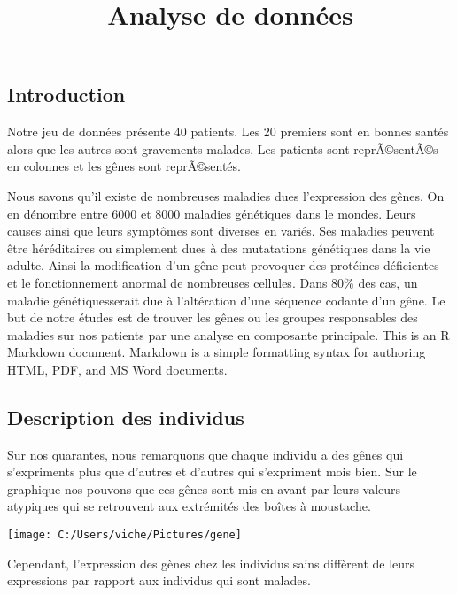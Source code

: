 \documentclass[]{article}
\title{Analyse de données}
\author{}
\date{}
\begin{document}
\maketitle

\hypertarget{introduction}{%
\subsection{Introduction}\label{introduction}}

Notre jeu de données présente 40 patients. Les 20 premiers sont en
bonnes santés alors que les autres sont gravements malades. Les patients
sont reprÃ©sentÃ©s en colonnes et les gênes sont reprÃ©sentés.

Nous savons qu'il existe de nombreuses maladies dues l'expression des
gênes. On en dénombre entre 6000 et 8000 maladies génétiques dans le
mondes. Leurs causes ainsi que leurs symptômes sont diverses en variés.
Ses maladies peuvent être héréditaires ou simplement dues à des
mutatations génétiques dans la vie adulte. Ainsi la modification d'un
gêne peut provoquer des protéines déficientes et le fonctionnement
anormal de nombreuses cellules. Dans 80\% des cas, un maladie
génétiquesserait due à l'altération d'une séquence codante d'un gêne. Le
but de notre études est de trouver les gênes ou les groupes responsables
des maladies sur nos patients par une analyse en composante principale.
This is an R Markdown document. Markdown is a simple formatting syntax
for authoring HTML, PDF, and MS Word documents.

\hypertarget{description-des-individus}{%
\subsection{Description des individus}\label{description-des-individus}}

Sur nos quarantes, nous remarquons que chaque individu a des gênes qui
s'expriments plus que d'autres et d'autres qui s'expriment mois bien.
Sur le graphique nos pouvons que ces gênes sont mis en avant par leurs
valeurs atypiques qui se retrouvent aux extrémités des boîtes à
moustache.

\begin{center}\texttt{[image: C:/Users/viche/Pictures/gene]} \end{center}

Cependant, l'expression des gènes chez les individus sains diffèrent de
leurs expressions par rapport aux individus qui sont malades.
\end{document}
